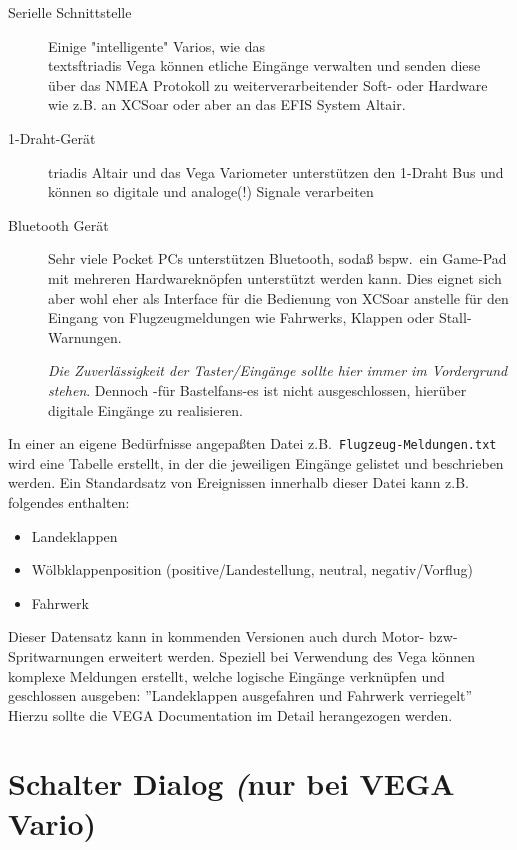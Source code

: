 \begin{description}
     \item[Serielle Schnittstelle]  Einige "intelligente" Varios, wie das \\textsf{triadis Vega} können etliche  Eingänge verwalten und senden diese über das NMEA Protokoll zu weiterverarbeitender Soft- oder Hardware wie z.B. an \textsf{XCSoar} oder aber an das EFIS System \textsf{Altair}.
     \item[1-Draht-Gerät]  \textsf{triadis \textsf{Altair}} und das Vega Variometer unterstützen den 1-Draht Bus und können so digitale und analoge(!) Signale verarbeiten
     \item[Bluetooth Gerät]  Sehr viele Pocket \textsf{PC}s unterstützen Bluetooth, sodaß bspw.\ ein Game-Pad mit mehreren  Hardwareknöpfen unterstützt werden kann. Dies eignet sich aber wohl eher als Interface für die Bedienung von \textsf{XCSoar} anstelle für den Eingang von Flugzeugmeldungen wie Fahrwerks, Klappen oder Stall-Warnungen.

        \textsl{Die Zuverlässigkeit der Taster/Eingänge sollte hier immer im Vordergrund stehen}.
        Dennoch -für Bastelfans-es ist nicht ausgeschlossen, hierüber digitale Eingänge zu realisieren.
\end{description}

In einer an eigene Bedürfnisse angepaßten Datei z.B.\ \texttt{Flugzeug-Meldungen.txt} wird eine Tabelle erstellt, in der die jeweiligen Eingänge gelistet und beschrieben werden. Ein Standardsatz von Ereignissen innerhalb dieser Datei  kann z.B. folgendes enthalten:
\begin{itemize}
\item Landeklappen
\item Wölbklappenposition (positive/Landestellung, neutral, negativ/Vorflug)
\item Fahrwerk
\end{itemize}

\halt Dieser Datensatz kann in kommenden Versionen auch durch Motor- bzw- Spritwarnungen erweitert werden.
Speziell bei Verwendung des Vega können komplexe Meldungen erstellt, welche logische Eingänge verknüpfen und geschlossen ausgeben: ''Landeklappen ausgefahren und Fahrwerk verriegelt''  Hierzu sollte die VEGA Documentation im Detail herangezogen werden.
\section{Schalter Dialog {\textit(nur bei VEGA Vario)}}

